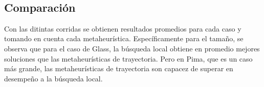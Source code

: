 \documentclass[11pt]{article}
\begin{document}
~\

\begin{table}[h]
\caption{Entonación de parámetros TS, donde la una tupla representa (\% Error de validación, \% Tamaño al que se reduce)}
\label{tabla:2}
\end{table}

\subsection{Comparación}

Con las ditintas corridas se obtienen resultados promedios para cada caso y tomando en cuenta cada metaheurística. Específicamente para el tamaño, se observa que para el caso de Glass, la búsqueda local obtiene en promedio mejores soluciones que las metaheurísticas de trayectoria. Pero en Pima, que es un caso más grande, las metaheurísticas de trayectoria son capacez de superar en desempeño a la búsqueda local.

\begin{table}[h]
\caption{Resultados para error de validación promedio con parámetros entonados}
\label{tabla:2}
\end{table}
\end{document}
